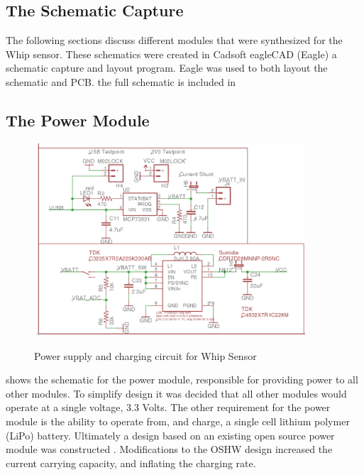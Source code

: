 \subsection {The Schematic Capture}

The following sections discuss different modules that were synthesized for the Whip sensor. These schematics were created in Cadsoft eagleCAD (Eagle) a schematic capture and layout program. Eagle was used to both layout the schematic and PCB. the full schematic is included in 


\subsection {The Power Module}
\begin{figure}
	\begin{center}
		\label{fig:Rev5_power}
		\includegraphics[scale=1,width=0.9\textwidth]{Images/Rev5_PowerSch.png} 
		\caption{Power supply and charging circuit for Whip Sensor}
	\end{center}
\end{figure}
 shows the schematic for the power module, responsible for providing power to all other modules. To simplify design it was decided that all other modules would operate at a single voltage, 3.3 Volts. The other requirement for the power module is the ability to operate from, and charge, a single cell lithium polymer (LiPo) battery. Ultimately a design based on an existing open source power module was constructed \cite{Sparkfun2012}. Modifications to the OSHW design increased the current carrying capacity, and inflating the charging rate.

